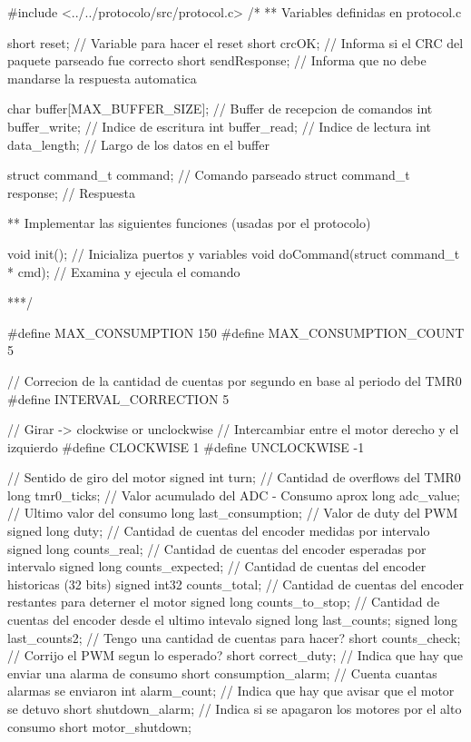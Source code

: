 \documentclass[a4paper,10pt]{article}
\begin{document}
{\begin{verbatimtab}
#include <../../protocolo/src/protocol.c>
/*
** Variables definidas en protocol.c

short reset; // Variable para hacer el reset
short crcOK; // Informa si el CRC del paquete parseado fue correcto
short sendResponse; // Informa que no debe mandarse la respuesta automatica

char buffer[MAX_BUFFER_SIZE];	// Buffer de recepcion de comandos
int buffer_write;				// Indice de escritura
int buffer_read;				// Indice de lectura
int data_length;				// Largo de los datos en el buffer

struct command_t command; 	// Comando parseado
struct command_t response; 	// Respuesta

** Implementar las siguientes funciones (usadas por el protocolo)

void init(); // Inicializa puertos y variables
void doCommand(struct command_t * cmd); // Examina y ejecula el comando

***/

#define MAX_CONSUMPTION	150
#define MAX_CONSUMPTION_COUNT	5

// Correcion de la cantidad de cuentas por segundo en base al periodo del TMR0
#define INTERVAL_CORRECTION	5

// Girar -> clockwise or unclockwise
// Intercambiar entre el motor derecho y el izquierdo
#define CLOCKWISE	1
#define UNCLOCKWISE	-1

// Sentido de giro del motor
signed int turn;
// Cantidad de overflows del TMR0
long tmr0_ticks;
// Valor acumulado del ADC - Consumo aprox
long adc_value;
// Ultimo valor del consumo
long last_consumption;
// Valor de duty del PWM
signed long duty;
// Cantidad de cuentas del encoder medidas por intervalo
signed long counts_real;
// Cantidad de cuentas del encoder esperadas por intervalo
signed long counts_expected;
// Cantidad de cuentas del encoder historicas (32 bits)
signed int32 counts_total;
// Cantidad de cuentas del encoder restantes para deterner el motor
signed long counts_to_stop;
// Cantidad de cuentas del encoder desde el ultimo intevalo
signed long last_counts;
signed long last_counts2;
// Tengo una cantidad de cuentas para hacer?
short counts_check;
// Corrijo el PWM segun lo esperado?
short correct_duty;
// Indica que hay que enviar una alarma de consumo
short consumption_alarm;
// Cuenta cuantas alarmas se enviaron
int alarm_count;
// Indica que hay que avisar que el motor se detuvo
short shutdown_alarm;
// Indica si se apagaron los motores por el alto consumo
short motor_shutdown;


\end{verbatimtab}}
\end{document}
